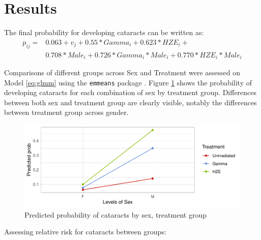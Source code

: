 \documentclass[12pt]{article}
\begin{document}
\section{Results}
\label{sec:results}

The final probability for developing cataracts can be written as:\\
\begin{equation}
\begin{aligned}
p_{ij} = &0.063 + v_j + 0.55*Gamma_i + 0.623*HZE_i + \\
&0.708*Male_i + 0.726*Gamma_i*Male_i + 0.770*HZE_i*Male_i
\end{aligned}
\label{eq:probs}
\end{equation}

Comparisons of different groups across Sex and Treatment were assessed on Model \eqref{eq:glmm} using the \texttt{emmeans} package \citep{R-emmeans}. Figure \ref{fig:contr} shows the probability of developing cataracts for each combination of sex by treatment group. Differences between both sex and treatment group are clearly visible, notably the differences between treatment group across gender.

\begin{figure}[H]

{\centering \includegraphics{bookdown_report_files/figure-latex/contr-1} 

}

\caption{Predicted probability of cataracts by sex, treatment group}\label{fig:contr}
\end{figure}

Assessing relative risk for cataracts between groups:\\
\end{document}

